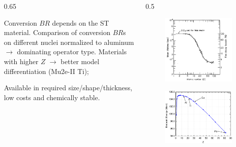 \documentclass{beamer}
\begin{document}
\begin{frame}
\begin{columns}
\begin{column}{0.65\framewidth}
\begin{itemize}
{\item Conversion $BR$ depends on the ST material. Comparison of conversion $BR$s on different nuclei 
normalized to aluminum $\rightarrow$ dominating 
operator type. Materials with higher $Z$ $\rightarrow$ better model differentiation (Mu2e-II Ti);
\item Available in required size/shape/thickness, low costs and chemically stable.}
    \end{itemize}
\end{column}   
 \begin{column}{0.5\framewidth}
    \begin{figure}[!h]
        \centering
        \includegraphics[width=0.8\columnwidth]{figures/png/lifetime_mu_matter.png}
        \label{fig:muonicatom}
 \end{figure}
       \begin{figure}[!h]
        \centering
        \includegraphics[width=0.8\columnwidth]{figures/png/endopint.png}
        \label{fig:endpoint}
    \label{fig:2imins}
  \end{figure}
\end{column}   
\end{columns}

\end{frame}
\end{document}
